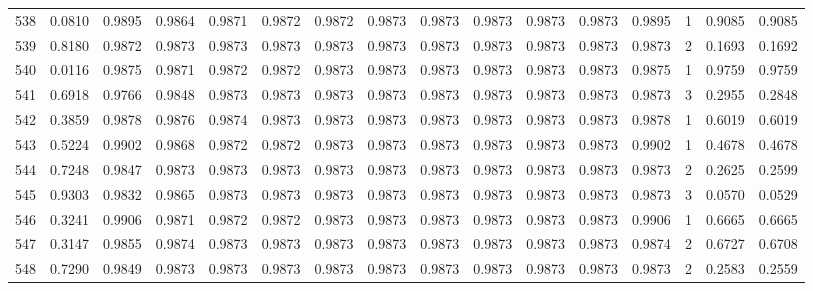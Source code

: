 \begin{tabular}{lrrrrrrrrrrrrrrr}
538 &      0.0810 &  0.9895 &  0.9864 &  0.9871 &  0.9872 &  0.9872 &  0.9873 &  0.9873 &  0.9873 &  0.9873 &   0.9873 &     0.9895 &      1 &                    0.9085 &                     0.9085 \\
539 &      0.8180 &  0.9872 &  0.9873 &  0.9873 &  0.9873 &  0.9873 &  0.9873 &  0.9873 &  0.9873 &  0.9873 &   0.9873 &     0.9873 &      2 &                    0.1693 &                     0.1692 \\
540 &      0.0116 &  0.9875 &  0.9871 &  0.9872 &  0.9872 &  0.9873 &  0.9873 &  0.9873 &  0.9873 &  0.9873 &   0.9873 &     0.9875 &      1 &                    0.9759 &                     0.9759 \\
541 &      0.6918 &  0.9766 &  0.9848 &  0.9873 &  0.9873 &  0.9873 &  0.9873 &  0.9873 &  0.9873 &  0.9873 &   0.9873 &     0.9873 &      3 &                    0.2955 &                     0.2848 \\
542 &      0.3859 &  0.9878 &  0.9876 &  0.9874 &  0.9873 &  0.9873 &  0.9873 &  0.9873 &  0.9873 &  0.9873 &   0.9873 &     0.9878 &      1 &                    0.6019 &                     0.6019 \\
543 &      0.5224 &  0.9902 &  0.9868 &  0.9872 &  0.9872 &  0.9873 &  0.9873 &  0.9873 &  0.9873 &  0.9873 &   0.9873 &     0.9902 &      1 &                    0.4678 &                     0.4678 \\
544 &      0.7248 &  0.9847 &  0.9873 &  0.9873 &  0.9873 &  0.9873 &  0.9873 &  0.9873 &  0.9873 &  0.9873 &   0.9873 &     0.9873 &      2 &                    0.2625 &                     0.2599 \\
545 &      0.9303 &  0.9832 &  0.9865 &  0.9873 &  0.9873 &  0.9873 &  0.9873 &  0.9873 &  0.9873 &  0.9873 &   0.9873 &     0.9873 &      3 &                    0.0570 &                     0.0529 \\
546 &      0.3241 &  0.9906 &  0.9871 &  0.9872 &  0.9872 &  0.9873 &  0.9873 &  0.9873 &  0.9873 &  0.9873 &   0.9873 &     0.9906 &      1 &                    0.6665 &                     0.6665 \\
547 &      0.3147 &  0.9855 &  0.9874 &  0.9873 &  0.9873 &  0.9873 &  0.9873 &  0.9873 &  0.9873 &  0.9873 &   0.9873 &     0.9874 &      2 &                    0.6727 &                     0.6708 \\
548 &      0.7290 &  0.9849 &  0.9873 &  0.9873 &  0.9873 &  0.9873 &  0.9873 &  0.9873 &  0.9873 &  0.9873 &   0.9873 &     0.9873 &      2 &                    0.2583 &                     0.2559 \\

\end{tabular}
